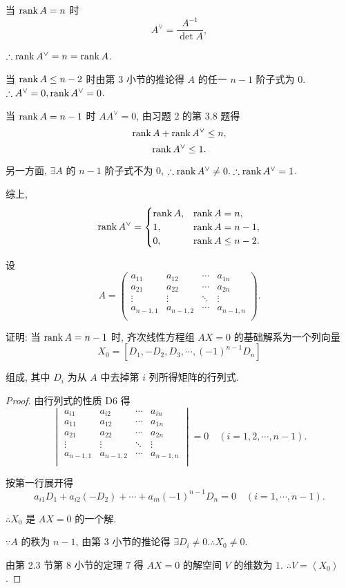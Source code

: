 \documentclass{ctexart}
\begin{document}
\begin{solution}
    当 $\operatorname{rank} A=n$ 时
    \[A^\vee=\dfrac{A^{-1}}{\det A},\]

    $\therefore\operatorname{rank} A^\vee=n=\operatorname{rank} A$.

    当 $\operatorname{rank} A\leq n-2$ 时由第 3 小节的推论得 $A$ 的任一 $n-1$ 阶子式为 $0$. $\therefore A^\vee=0,\operatorname{rank} A^\vee=0$.

    当 $\operatorname{rank} A=n-1$ 时 $AA^\vee=0$, 由习题 2 的第 3.8 题得
    \[\operatorname{rank} A+\operatorname{rank} A^\vee\leq n,\]
    \[\operatorname{rank} A^\vee\leq1.\]

    另一方面, $\exists A$ 的 $n-1$ 阶子式不为 $0$, $\therefore\operatorname{rank} A^\vee\neq0.\therefore\operatorname{rank} A^\vee=1$.

    综上,
    \[\operatorname{rank} A^\vee=\begin{cases}
        \operatorname{rank} A, & \operatorname{rank} A=n, \\
        1, & \operatorname{rank} A=n-1, \\
        0, & \operatorname{rank} A\leq n-2. \\
    \end{cases}\]
\end{solution}
\begin{exercise}\label{ex3.4}
    设
    \[A=\begin{pmatrix}
        a_{11} & a_{12} & \cdots & a_{1n} \\
        a_{21} & a_{22} & \cdots & a_{2n} \\
        \vdots & \vdots & \ddots & \vdots \\
        a_{n-1,1} & a_{n-1,2} & \cdots & a_{n-1,n} \\
    \end{pmatrix}.\]

    证明: 当 $\operatorname{rank} A=n-1$ 时, 齐次线性方程组 $AX=0$ 的基础解系为一个列向量
    \[X_0=[D_1,-D_2,D_3,\cdots,(-1)^{n-1}D_n]\]

    组成, 其中 $D_i$ 为从 $A$ 中去掉第 $i$ 列所得矩阵的行列式.
\end{exercise}
\begin{proof}
    由行列式的性质 D6 得
    \[\begin{vmatrix}
        a_{i1} & a_{i2} & \cdots & a_{in} \\
        a_{11} & a_{12} & \cdots & a_{1n} \\
        a_{21} & a_{22} & \cdots & a_{2n} \\
        \vdots & \vdots & \ddots & \vdots \\
        a_{n-1,1} & a_{n-1,2} & \cdots & a_{n-1,n} \\
    \end{vmatrix}=0\quad(i=1,2,\cdots,n-1).\]

    按第一行展开得
    \[a_{i1}D_1+a_{i2}(-D_2)+\cdots+a_{in}(-1)^{n-1}D_n=0\quad(i=1,\cdots,n-1).\]

    $\therefore X_0$ 是 $AX=0$ 的一个解.

    $\because A$ 的秩为 $n-1$, 由第 3 小节的推论得 $\exists D_i\neq0.\therefore X_0\neq0$.

    由第 2.3 节第 8 小节的定理 7 得 $AX=0$ 的解空间 $V$ 的维数为 $1$. $\therefore V=\left<X_0\right>$.
\end{proof}
\end{document}
